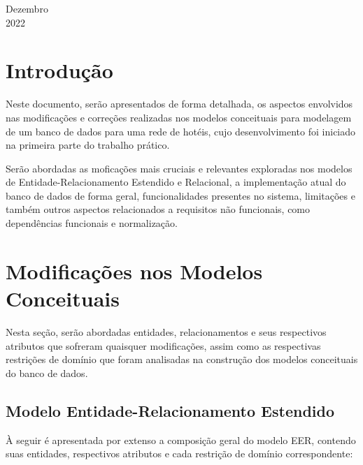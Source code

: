 \documentclass[a4paper, 12pt]{article}
\begin{document}
\begin{titlepage}
	\begin{center}
		\vspace{\fill}
			Dezembro\\
		    2022
	\end{center}
\end{titlepage}

\tableofcontents
\newpage

\section{Introdução}

Neste documento, serão apresentados de forma detalhada, os aspectos envolvidos nas modificações e correções realizadas nos modelos conceituais para modelagem de um banco de dados para uma rede de hotéis, cujo desenvolvimento foi iniciado na primeira parte do trabalho prático.

Serão abordadas as moficações mais cruciais e relevantes exploradas nos modelos de Entidade-Relacionamento Estendido e Relacional, a implementação atual do banco de dados de forma geral, funcionalidades presentes no sistema, limitações e também outros aspectos relacionados a requisitos não funcionais, como dependências funcionais e normalização.

\section{Modificações nos Modelos Conceituais}

Nesta seção, serão abordadas entidades, relacionamentos e seus respectivos atributos que sofreram quaisquer modificações, assim como as respectivas restrições de domínio que foram analisadas na construção dos modelos conceituais do banco de dados.

\subsection{Modelo Entidade-Relacionamento Estendido}

À seguir é apresentada por extenso a composição geral do modelo EER, contendo suas entidades, respectivos atributos e cada restrição de domínio correspondente:
\end{document}
